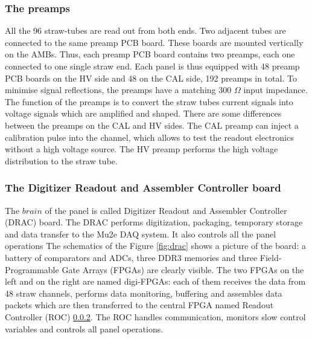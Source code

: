 \subsubsection{The preamps}\label{preampss}
All the 96 straw-tubes are read out from both ends. 
Two adjacent tubes are connected to the same preamp PCB board. 
These boards are mounted vertically on the AMBs. 
Thus, each preamp PCB board contains two preamps,  
each one connected to one single straw end. 
Each panel is thus equipped with 48 preamp PCB boards on the HV 
side and 48 on the CAL side, 192 preamps in total.
To minimise signal reflections, the preamps have a matching 300 $\Omega$ input impedance. 
The function of the preamps is to convert the straw tubes 
current signals into voltage signals which are amplified and shaped. 
There are some differences between the preamps on the CAL and 
HV sides. The CAL preamp can inject a calibration pulse into 
the channel, which allows to test the readout electronics without a 
high voltage source. The HV preamp performs the high voltage 
distribution to the straw tube.
\subsubsection{The Digitizer Readout and Assembler Controller board}\label{DRAC}
The $brain$ of the panel is called Digitizer Readout and Assembler Controller (DRAC) board. 
The DRAC performs digitization, packaging, temporary storage and data transfer to 
the Mu2e DAQ system. It also controls all the panel operations The schematics of the 
Figure \ref{fig:drac} shows a picture of the board: a battery of comparators 
and ADCs, three DDR3 memories and three Field-Programmable Gate Arrays (FPGAs) 
are clearly visible. 
The two FPGAs on the left and on the right are named digi-FPGAs: 
each of them receives the data from 48 straw channels, performs data 
monitoring, buffering and assembles data packets which are then 
transferred to the central FPGA named Readout Controller (ROC) \ref{DRAC}. 
The ROC handles communication, monitors slow control variables and 
controls all panel operations.


